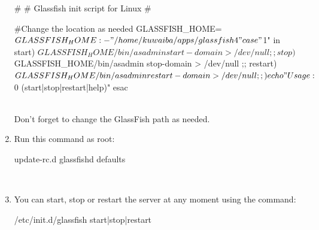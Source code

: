 \documentclass[a4paper]{article}
\begin{document}
\begin{appendices}
\begin{enumerate}
\begin{verbbox}
						#
						# Glassfish init script for Linux
						#
						
						#Change the location as needed
						GLASSFISH_HOME=${GLASSFISH_HOME:-"/home/kuwaiba/apps/glassfish4"}
						
						case "$1" in
						start)
						$GLASSFISH_HOME/bin/asadmin start-domain > /dev/null
						;;
						stop)
						$GLASSFISH_HOME/bin/asadmin stop-domain > /dev/null
						;;
						restart)
						$GLASSFISH_HOME/bin/asadmin restart-domain > /dev/null
						;;
						\*)
						echo "Usage: $0 (start|stop|restart|help)"
						esac
					\end{verbbox}
					\begin{figure}[ht]
						\centering	
						\theverbbox
					\end{figure}\\
					Don't forget to change the GlassFish path as needed.
					\item Run this command as root:
					\begin{verbbox}
						update-rc.d glassfishd defaults
					\end{verbbox}
					\begin{figure}[ht]
						\centering	
						\theverbbox
					\end{figure}\\
					\item You can start, stop or restart the server at any moment using the command:
					\begin{verbbox}
						/etc/init.d/glassfish start|stop|restart
					\end{verbbox}
					\begin{figure}[ht]
						\centering	
						\theverbbox
					\end{figure}
					
				\end{enumerate}
			\newpage

\end{appendices}
\end{document}
